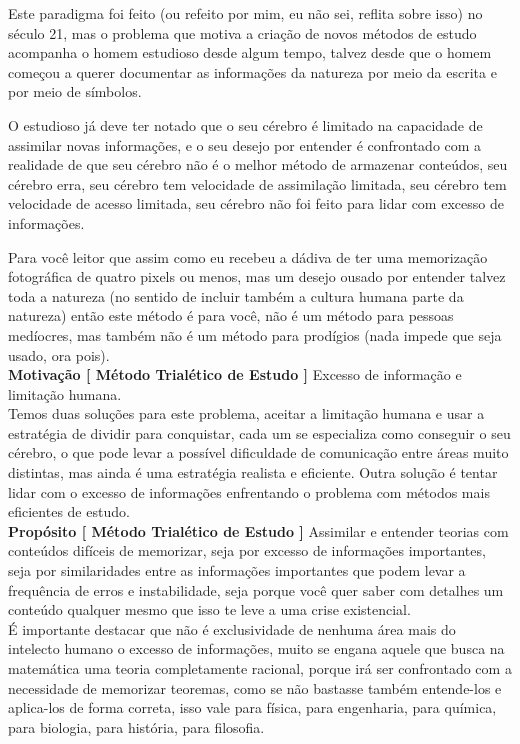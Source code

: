 Este paradigma foi feito (ou refeito por mim, eu não sei, reflita sobre isso) no século 21, mas o problema que motiva a criação de novos métodos de estudo acompanha o homem estudioso desde algum tempo, talvez desde que o homem começou a querer documentar as informações da natureza por meio da escrita e por meio de símbolos. 

O estudioso já deve ter notado que o seu cérebro é limitado na capacidade de assimilar novas informações, e o seu desejo por entender é confrontado com a realidade de que seu cérebro não é o melhor método de armazenar conteúdos, seu cérebro erra, seu cérebro tem velocidade de assimilação limitada, seu cérebro tem velocidade de acesso limitada, seu cérebro não foi feito para lidar com excesso de informações. 

Para você leitor que assim como eu recebeu a dádiva de ter uma memorização fotográfica de quatro pixels ou menos, mas um desejo ousado por entender talvez toda a natureza (no sentido de incluir também a cultura humana parte da natureza) então este método é para você, não é um método para pessoas medíocres, mas também não é um método para prodígios (nada impede que seja usado, ora pois).\\

\textbf{Motivação [ Método Trialético de Estudo ]} Excesso de informação e limitação humana.\\

Temos duas soluções para este problema, aceitar a limitação humana e usar a estratégia de dividir para conquistar, cada um se especializa como conseguir o seu cérebro, o que pode levar a possível dificuldade de comunicação entre áreas muito distintas, mas ainda é uma estratégia realista e eficiente. Outra solução é tentar lidar com o excesso de informações enfrentando o problema com métodos mais eficientes de estudo.\\

\textbf{Propósito [ Método Trialético de Estudo ]} Assimilar e entender teorias com conteúdos difíceis de memorizar, seja por excesso de informações importantes, seja por similaridades entre as informações importantes que podem levar a frequência de erros e instabilidade, seja porque você quer saber com detalhes um conteúdo qualquer mesmo que isso te leve a uma crise existencial.\\

É importante destacar que não é exclusividade de nenhuma área mais do intelecto humano o excesso de informações, muito se engana aquele que busca na matemática uma teoria completamente racional, porque irá ser confrontado com a necessidade de memorizar teoremas, como se não bastasse também entende-los e aplica-los de forma correta, isso vale para física, para engenharia, para química, para biologia, para história, para filosofia. 

